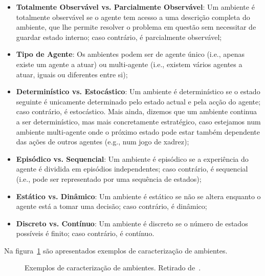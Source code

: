 \begin{itemize}
    \item \textbf{Totalmente Observável vs. Parcialmente Observável}: Um ambiente é totalmente observável se o agente tem acesso a uma descrição completa do ambiente, que lhe permite resolver o problema em questão sem necessitar de guardar estado interno; caso contrário, é parcialmente observável;
    \item \textbf{Tipo de Agente}: Os ambientes podem ser de agente único (i.e., apenas existe um agente a atuar) ou multi-agente (i.e., existem vários agentes a atuar, iguais ou diferentes entre si);
    \item \textbf{Determinístico vs. Estocástico}: Um ambiente é determinístico se o estado seguinte é unicamente determinado pelo estado actual e pela acção do agente; caso contrário, é estocástico.
    Mais ainda, dizemos que um ambiente continua a ser determinístico, mas mais concretamente estratégico, caso estejamos num ambiente multi-agente onde o próximo estado pode estar também dependente das ações de outros agentes (e.g., num jogo de xadrez);
    \item \textbf{Episódico vs. Sequencial}: Um ambiente é episódico se a experiência do agente é dividida em episódios independentes; caso contrário, é sequencial (i.e., pode ser representado por uma sequência de estados);
    \item \textbf{Estático vs. Dinâmico}: Um ambiente é estático se não se altera enquanto o agente está a tomar uma decisão; caso contrário, é dinâmico;
    \item \textbf{Discreto vs. Contínuo}: Um ambiente é discreto se o número de estados possíveis é finito; caso contrário, é contínuo.
\end{itemize}

Na figura~\ref{fig:ambientes-exemplos} são apresentados exemplos de caracterização de ambientes.

\begin{figure}[H]
    \begin{center}
    \end{center}
    \caption{Exemplos de caracterização de ambientes.
    Retirado de~\cite{ist:leic:resumos:agentes}.}\label{fig:ambientes-exemplos}
\end{figure}


